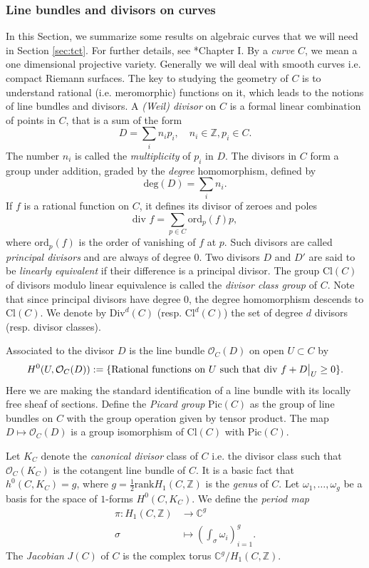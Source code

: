 \documentclass[11pt]{article} %
\theoremstyle{definition}
\newcommand{\Z}{{\mathbb Z}}
\newcommand{\C}{{\mathbb C}}
\newcommand\restr[2]{{%
  \left.\kern-\nulldelimiterspace %
  #1 %
  \vphantom{\big|} %
  \right|_{#2} %
  }}
\newcommand{\ra}{\rightarrow}
\newcommand{\la}{\label}
\begin{document}
\subsubsection{Line bundles and divisors on curves}\la{sec:curves}
In this Section, we summarize some results on  algebraic curves that we will need in Section \ref{sec:tct}. For further details, see \cite{ACGH}*{Chapter I}. By a \textit{curve} $C$, we mean a one dimensional projective variety. Generally we will deal with smooth curves i.e. compact Riemann surfaces. The key to studying the geometry of $C$ is to understand rational (i.e. meromorphic) functions on it, which leads to the notions of line bundles and divisors. A \textit{(Weil) divisor} on $C$ is a formal linear combination of points in $C$, that is a sum of the form
\[
D=\sum_{i}n_i p_i, \quad n_i \in \Z, p_i \in C.
\]
The number $n_i$ is called the \textit{multiplicity} of $p_i$ in $D$. The divisors in $C$ form a group under addition, graded by the \textit{degree} homomorphism, defined by
\[
\text{deg}(D)=\sum_i n_i.
\]
If $f$ is a rational function on $C$, it defines its divisor of zeroes and poles
\[
\text{div }f=\sum_{p \in C} \text{ord}_p(f) p,
\]
where $\text{ord}_p(f)$ is the order of vanishing of $f$ at $p$. Such divisors are called \textit{principal divisors} and are always of degree $0$. Two divisors $D$ and $D'$ are said to be \textit{linearly equivalent} if their difference is a principal divisor. The group $\text{Cl}(C)$ of divisors modulo linear equivalence is called the \textit{divisor class group} of $C$. Note that since principal divisors have degree $0$, the degree homomorphism descends to $\text{Cl}(C)$. We denote by $\text{Div}^d(C)$ (resp. $\text{Cl}^d(C)$) the set of degree $d$ divisors (resp. divisor classes). 

Associated to the divisor $D$ is the line bundle $\mathcal O_C(D)$ on open $U \subset C$ by
\[
H^0(U,\mathcal O_C(D)):=\{\text{Rational functions on $U$ such that }\restr{\text{div }f + D}{U} \geq 0\}.
\]
Here we are making the standard identification of a line bundle with its locally free sheaf of sections. Define the \textit{Picard group} $\text{Pic}(C)$ as the group of line bundles on $C$ with the group operation given by tensor product. The map $D \mapsto \mathcal O_C(D)$ is a group isomorphism of $\text{Cl}(C)$ with $\text{Pic}(C)$. 

Let $K_C$ denote the \textit{canonical divisor} class of $C$ i.e. the divisor class such that $\mathcal O_C(K_C)$ is the cotangent line bundle of $C$. It is a basic fact that $h^0(C,K_C) = g$, where $g = \frac 1 2 \text{rank} H_1(C,\Z)$ is the \textit{genus} of $C$. Let $\omega_1,\dots,\omega_g$ be a basis for the space of $1$-forms $H^0(C,K_C)$. We define the \textit{period map} 
\begin{align*}
   \pi: H_1(C,\Z) & \ra \C^g\\
    \sigma &\mapsto \left( \int_\sigma \omega_i \right)_{i=1}^g.
\end{align*}
The \textit{Jacobian} $J(C)$ of $C$ is the complex torus $\C^g/H_1(C,\Z)$.
\end{document}
